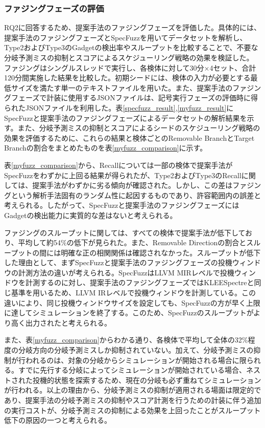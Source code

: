 \subsubsection{ファジングフェーズの評価}
RQ2に回答するため、提案手法のファジングフェーズを評価した。具体的には、提案手法のファジングフェーズとSpecFuzzを用いてデータセットを解析し、Type2およびType3のGadgetの検出率やスループットを比較することで、不要な分岐予測ミスの抑制とスコアによるスケジューリング戦略の効果を検証した。
ファジングはシングルスレッドで実行し、各検体に対して30分×4セット、合計120分間実施した結果を比較した。初期シードには、検体の入力が必要とする最低サイズを満たす単一のテキストファイルを用いた。また、提案手法のファジングフェーズで計装に使用するJSONファイルは、記号実行フェーズの評価時に得られたJSONファイルを利用した。表\ref{specfuzz_result},\ref{myfuzz_result}にSpecFuzzと提案手法のファジングフェーズによるデータセットの解析結果を示す。また、分岐予測ミスの抑制とスコアによるシードのスケジューリング戦略の効果を評価するために、これらの結果と検体ごとのRemovable BranchとTarget Branchの割合をまとめたものを表\ref{myfuzz_comparison}に示す。\par

表\ref{myfuzz_comparison}から、Recallについては一部の検体で提案手法がSpecFuzzをわずかに上回る結果が得られたが、Type2およびType3のRecallに関しては、提案手法がわずかに劣る傾向が確認された。しかし、この差はファジングという解析手法固有のランダム性に起因するものであり、許容範囲内の誤差と考えられる。したがって、SpecFuzzと提案手法のファジングフェーズにはGadgetの検出能力に実質的な差はないと考えられる。\par

ファジングのスループットに関しては、すべての検体で提案手法が低下しており、平均して約54\%の低下が見られた。また、Removable Directionの割合とスループットの間には明確な正の相関関係は確認されなかった。スループットが低下した理由として、まずSpecFuzzと提案手法のファジングフェーズの投機ウィンドウの計測方法の違いが考えられる。SpecFuzzはLLVM MIRレベルで投機ウィンドウを計測するのに対し、提案手法のファジングフェーズではKLEESpectreと同じ基準を用いるため、LLVM IRレベルで投機ウィンドウを計測している。この違いにより、同じ投機ウィンドウサイズを設定しても、SpecFuzzの方が早く上限に達してシミュレーションを終了する。このため、SpecFuzzのスループットがより高く出力されたと考えられる。

また、表\ref{myfuzz_comparison}からわかる通り、各検体で平均して全体の32\%程度の分岐方向の分岐予測ミスしか抑制されていない。加えて、分岐予測ミスの抑制が行われるのは、対象の分岐からシミュレーションが開始される場合に限られる。すでに先行する分岐によってシミュレーションが開始されている場合、ネストされた投機的状態を探索するため、現在の分岐も必ず重ねてシミュレーションが行われる。以上の理由から、分岐予測ミスの抑制が適用される場面は限定的であり、提案手法の分岐予測ミスの抑制やスコア計測を行うための計装に伴う追加の実行コストが、分岐予測ミスの抑制による効果を上回ったことがスループット低下の原因の一つと考えられる。


